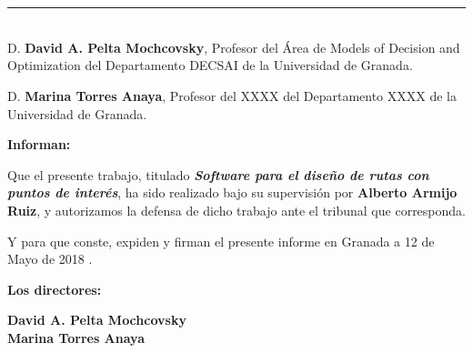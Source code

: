 \chapter*{}
\thispagestyle{empty}

\noindent\rule[-1ex]{\textwidth}{2pt}\\[4.5ex]

D. \textbf{David A. Pelta Mochcovsky}, Profesor del Área de Models of Decision and Optimization del Departamento DECSAI de la Universidad de Granada.\newline

D. \textbf{Marina Torres Anaya}, Profesor del XXXX del Departamento XXXX de la Universidad de Granada.

\vspace{0.5cm}

\textbf{Informan:}

\vspace{0.5cm}

Que el presente trabajo, titulado \textit{\textbf{Software para el diseño de rutas con puntos de interés}},
ha sido realizado bajo su supervisión por \textbf{Alberto Armijo Ruiz}, y autorizamos la defensa de dicho trabajo ante el tribunal
que corresponda.

\vspace{0.5cm}

Y para que conste, expiden y firman el presente informe en Granada a 12 de Mayo de 2018 .

\vspace{1cm}

\textbf{Los directores:}

\vspace{5cm}

\noindent \textbf{David A. Pelta Mochcovsky} \\
\noindent \textbf{Marina Torres Anaya}


